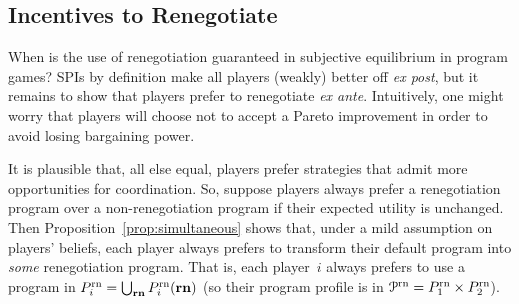 \documentclass[sigconf]{aamas}
\newcommand{\allprogrn}{\allprog^{\text{rn}}}
\theoremstyle{definition}
\begin{document}
\subsection{Incentives to Renegotiate}
\label{sec:implement}

When is the use of renegotiation 
guaranteed in subjective equilibrium
in program games?
SPIs by definition make all players
(weakly) better off
\textit{ex post},
but
it remains to show that
players
prefer to renegotiate \textit{ex ante}. Intuitively, one might worry
that players
will choose not to accept a Pareto improvement
in order to avoid losing bargaining power.

It is plausible
that, all else equal,
players prefer strategies
that 
admit more opportunities for
coordination.
So, suppose
players always prefer
a renegotiation program
over a non-renegotiation program
if their expected
utility is unchanged.
Then Proposition~\ref{prop:simultaneous}
shows that,
under a mild assumption on players'
beliefs,
each player 
always
prefers to
transform their default program
into \textit{some}
renegotiation program.
That is, each player~$i$ always prefers to
use a program
in $P_i^{\textnormal{rn}} = \bigcup_{\mathbf{rn}} P_i^{\textnormal{rn}}(\mathbf{rn})$
(so their program profile is in $\allprogrn = \onefsspaceone \times \onefsspacetwo$).
\end{document}
